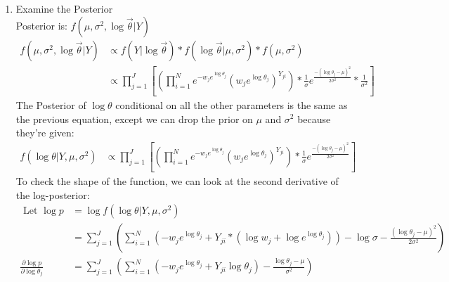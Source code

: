 \documentclass[paper=a4, fontsize=11pt]{scrartcl}
\newcommand{\parens}[1]{ \left( #1 \right) }
\begin{document}
  \begin{enumerate}
    \item Examine the Posterior \\

      Posterior is: $f(\mu, \sigma^2, \log{\vec{\theta}} | Y)$
      \begin{align*}
        f(\mu, \sigma^2, \log{\vec{\theta}} | Y) &\propto f(Y|\log{\vec{\theta}}) * f(\log{\vec{\theta}}|\mu, \sigma^2) * f(\mu, \sigma^2) \\
        &\propto \prod_{j=1}^{J}{
          \left[ \parens{
            \prod_{i=1}^N{
              e^{-w_je^{\log{\theta_j}}}\parens{w_je^{\log{\theta_j}}}^{Y_{ji}}
            }}
            * \frac{1}{\sigma}e^{
                                  \frac{-(\log{\theta_j}-\mu)^2}{2\sigma^2}
                                }
            * \frac{1}{\sigma^2}
          \right]
        }
      \end{align*}
      The Posterior of $\log{\theta}$ conditional on all the other parameters is the same as the previous equation, except we can drop the prior on $\mu$ and $\sigma^2$ because they're given:
      \begin{align*}
        f(\log{\theta} | Y, \mu, \sigma^2)
          &\propto \prod_{j=1}^{J}{
            \left[ \parens{
              \prod_{i=1}^N{
                e^{-w_je^{\log{\theta_j}}}\parens{w_je^{\log{\theta_j}}}^{Y_{ji}}
              }}
              * \frac{1}{\sigma}e^{
                                    \frac{-(\log{\theta_j}-\mu)^2}{2\sigma^2}
                                  }
            \right]
          }
      \end{align*}
      To check the shape of the function, we can look at the second derivative of the log-posterior:
      \begin{align*}
        \text{ Let } \log{p} &= \log{f(\log{\theta} | Y, \mu, \sigma^2)} \\
          &= \sum_{j = 1}^J{
            \parens{
              \sum_{i = 1}^N{ \parens{
                -w_je^{ \log{ \theta_j }} + Y_{ji}*\parens{ \log{w_j} + \log{e^{\log{\theta_j}}} }
              }}
              - \log{\sigma}
              - \frac{ \parens{ \log{\theta_j} - \mu}^2}{2\sigma^2}
            }
          } \\
        \frac{\partial{\log{p}}}{\partial{\log{\theta_j}}}
          &= \sum_{j=1}^J{
            \parens{
              \sum_{i=1}^N{ \parens{
                -w_je^{\log{\theta_j}} + Y_{ji}\log{\theta_j}
              }}
              - \frac{\log{\theta_j} - \mu}{\sigma^2}
}}
\end{align*}
\end{enumerate}
\end{document}
